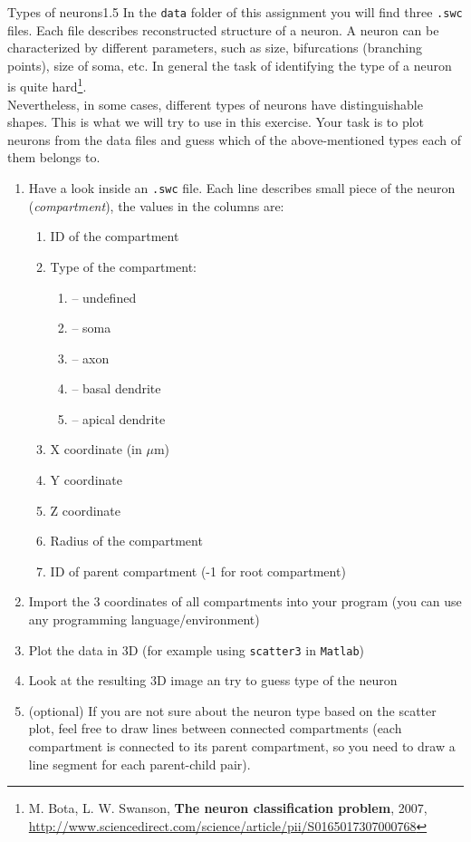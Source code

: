\documentclass[a4paper,11pt]{article}
\begin{document}
\begin{exercise}{3}{Types of neurons}{1.5}
In the \texttt{data} folder of this assignment you will find three \texttt{.swc} files. Each file describes reconstructed structure of a neuron. A neuron can be characterized by different parameters, such as size, bifurcations (branching points), size of soma, etc. In general the task of identifying the type of a neuron is quite hard\footnote{M. Bota, L. W. Swanson, \textbf{The neuron classification problem}, 2007, 
\url{http://www.sciencedirect.com/science/article/pii/S0165017307000768}}. \\
Nevertheless, in some cases, different types of neurons have distinguishable shapes. This is what we will try to use in this exercise. Your task is to plot neurons from the data files and guess which of the above-mentioned types each of them belongs to.
\begin{enumerate}
	\item Have a look inside an \texttt{.swc} file. Each line describes small piece of the neuron (\emph{compartment}), the values in the columns are: 
	\begin{enumerate}
		\item ID of the compartment
		\item Type of the compartment:
		\begin{enumerate}
			\item[0] -- undefined
			\item[1] -- soma
			\item[2] -- axon
			\item[3] -- basal dendrite
			\item[4] -- apical dendrite
		\end{enumerate}
		\item X coordinate (in $\mu$m)
		\item Y coordinate
		\item Z coordinate	
		\item Radius of the compartment
		\item ID of parent compartment (-1 for root compartment)
	\end{enumerate}
	\item Import the 3 coordinates of all compartments into your program (you can use any programming language/environment)
	\item Plot the data in 3D (for example using \texttt{scatter3} in \texttt{Matlab})
	\item Look at the resulting 3D image an try to guess type of the neuron
	\item (optional) If you are not sure about the neuron type based on the scatter plot, feel free to draw lines between connected compartments (each compartment is connected to its parent compartment, so you need to draw a line segment for each parent-child pair).

\end{enumerate}
\end{exercise}
\end{document}
